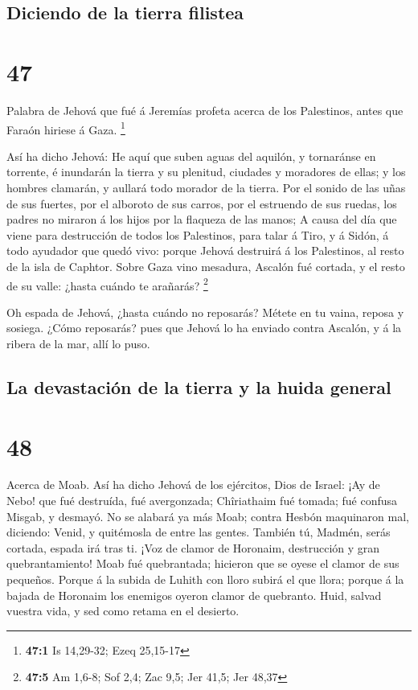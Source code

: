 \hypertarget{diciendo-de-la-tierra-filistea}{%
\subsection{Diciendo de la tierra
filistea}\label{diciendo-de-la-tierra-filistea}}

\hypertarget{section-46}{%
\section{47}\label{section-46}}

 Palabra de Jehová que fué á Jeremías profeta acerca de los
Palestinos, antes que Faraón hiriese á Gaza. \footnote{\textbf{47:1} Is
  14,29-32; Ezeq 25,15-17}

 Así ha dicho Jehová: He aquí que suben aguas del aquilón, y
tornaránse en torrente, é inundarán la tierra y su plenitud, ciudades y
moradores de ellas; y los hombres clamarán, y aullará todo morador de la
tierra.  Por el sonido de las uñas de sus fuertes, por el
alboroto de sus carros, por el estruendo de sus ruedas, los padres no
miraron á los hijos por la flaqueza de las manos;  A causa
del día que viene para destrucción de todos los Palestinos, para talar á
Tiro, y á Sidón, á todo ayudador que quedó vivo: porque Jehová destruirá
á los Palestinos, al resto de la isla de Caphtor.  Sobre
Gaza vino mesadura, Ascalón fué cortada, y el resto de su valle: ¿hasta
cuándo te arañarás? \footnote{\textbf{47:5} Am 1,6-8; Sof 2,4; Zac 9,5;
  Jer 41,5; Jer 48,37}

 Oh espada de Jehová, ¿hasta cuándo no reposarás? Métete en
tu vaina, reposa y sosiega.  ¿Cómo reposarás? pues que
Jehová lo ha enviado contra Ascalón, y á la ribera de la mar, allí lo
puso.

\hypertarget{la-devastaciuxf3n-de-la-tierra-y-la-huida-general}{%
\subsection{La devastación de la tierra y la huida
general}\label{la-devastaciuxf3n-de-la-tierra-y-la-huida-general}}

\hypertarget{section-47}{%
\section{48}\label{section-47}}

 Acerca de Moab. Así ha dicho Jehová de los ejércitos, Dios
de Israel: ¡Ay de Nebo! que fué destruída, fué avergonzada; Chîriathaim
fué tomada; fué confusa Misgab, y desmayó.  No se alabará ya
más Moab; contra Hesbón maquinaron mal, diciendo: Venid, y quitémosla de
entre las gentes. También tú, Madmén, serás cortada, espada irá tras ti.
 ¡Voz de clamor de Horonaim, destrucción y gran
quebrantamiento!  Moab fué quebrantada; hicieron que se
oyese el clamor de sus pequeños.  Porque á la subida de
Luhith con lloro subirá el que llora; porque á la bajada de Horonaim los
enemigos oyeron clamor de quebranto.  Huid, salvad vuestra
vida, y sed como retama en el desierto.

